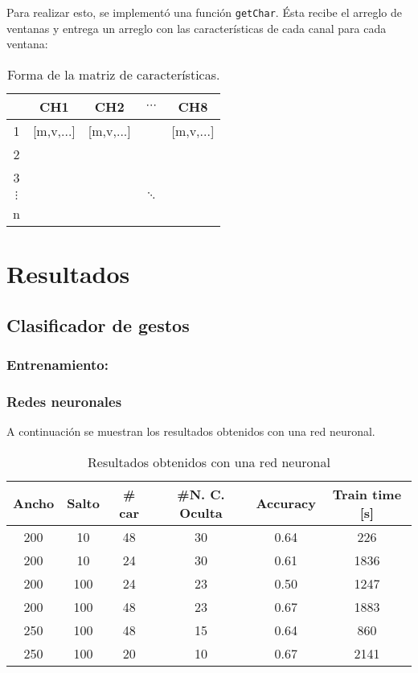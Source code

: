 Para realizar esto, se implementó una función \texttt{getChar}. Ésta recibe el arreglo de ventanas y entrega un arreglo con las características de cada canal para cada ventana:

\begin{table}[H]
\centering
\begin{tabular}{|c|c|c|c|c|}
\hline
\textbf{} & \textbf{CH1}          & \textbf{CH2}          & \textbf{$\cdots$} & \textbf{CH8} \\ \hline
1                 & [m,v,...] & [m,v,...] &        &   [m,v,...]  \\ \hline
2                 &              &              &        &     \\ \hline
3                 &              &              &      &     \\ \hline
$\vdots$            &              &              &   $\ddots$     &     \\ \hline
n         &              &              &        &     \\ \hline
\end{tabular}
\caption{Forma de la matriz de características.}
\label{tab:matcar}
\end{table}


\newpage
\section{Resultados}
\subsection{Clasificador de gestos}
\subsubsection*{Entrenamiento:}
\subsubsection{Redes neuronales}
\par A continuación se muestran los resultados obtenidos con una red neuronal.

\begin{table}[H]
\centering
\begin{tabular}{|c|c|c|c|c|c|}
\hline
\textbf{Ancho} & \textbf{Salto} & \textbf{\# car} &\textbf{\#N. C. Oculta} & \textbf{Accuracy} & \textbf{Train time [s]}  \\ \hline
200     & 10 &  48     & 30     & 0.64 & 226   \\ \hline
200     & 10   & 24    & 30  & 0.61   & 1836  \\ \hline
200     & 100   & 24    & 23  & 0.50   & 1247  \\ \hline
200     & 100   & 48    & 23  & 0.67   & 1883  \\ \hline
250     & 100   & 48    & 15  & 0.64   & 860  \\ \hline
250     & 100   & 20    & 10  & 0.67   & 2141  \\ \hline
\end{tabular}
\caption{Resultados obtenidos con una red neuronal}
\label{tab:rnn}
\end{table}

